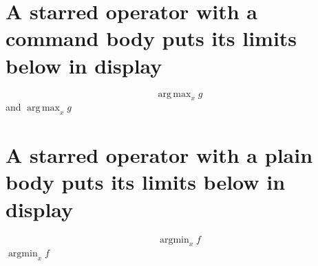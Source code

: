 \documentclass{article}
\DeclareMathOperator*{\argmax}{arg\,max}
\DeclareMathOperator*{\argmin}{argmin}
\begin{document}
\section{A starred operator with a command body puts its limits below in display}
\[\argmax_x g\] and $\argmax_x g$

\section{A starred operator with a plain body puts its limits below in display}
\[\argmin_x f\] $\argmin_x f$
\end{document}
